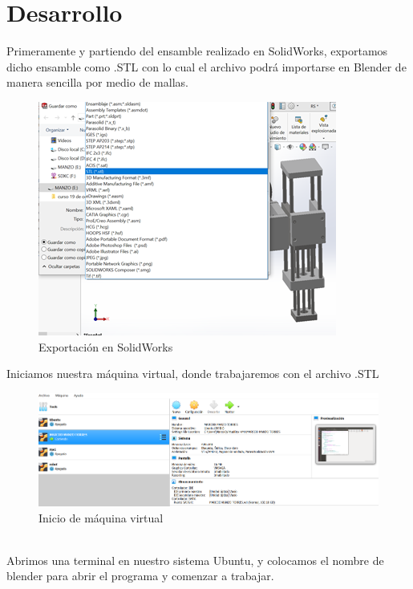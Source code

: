 \documentclass[11pt,a4paper,oldfontcommands,oneside]{memoir}
\begin{document}
\chapter{Desarrollo}
Primeramente y partiendo del ensamble realizado en SolidWorks, exportamos dicho ensamble como .STL con lo cual el archivo podrá importarse en Blender de manera sencilla por medio de mallas.

\begin{figure}[h]
\includegraphics[scale=.9]{1.png}
\caption{Exportación en SolidWorks}
\label{Imagen 1}
\end{figure}
Iniciamos nuestra máquina virtual, donde trabajaremos con el archivo .STL
\begin{figure}[h]
\includegraphics[scale=.7]{maquina.png}
\caption{Inicio de máquina virtual}
\label{Imagen 2}
\end{figure}\\
Abrimos una terminal en nuestro sistema Ubuntu, y colocamos el nombre de blender para abrir el programa y comenzar a trabajar.
\end{document}
